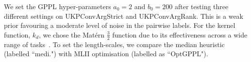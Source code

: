 We set the GPPL hyper-parameters $a_0=2$ and $b_0=200$ after
testing three different settings on UKPConvArgStrict and UKPConvArgRank.
This is a weak prior favouring a moderate level of noise in the pairwise labels.
For the kernel function, $k_d$, we chose the Mat\'ern $\frac{3}{2}$ function due to its 
effectiveness across a wide range of tasks~\cite{rasmussen_gaussian_2006}.
To set the length-scales, we compare the median heuristic (labelled ``medi.")
with MLII optimisation (labelled as ``OptGPPL").

% 
% 

